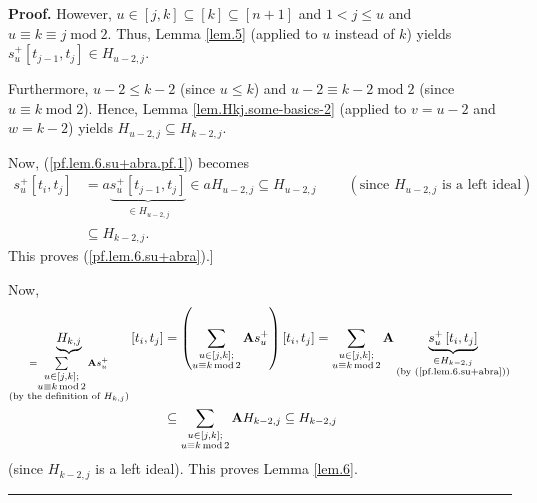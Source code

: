 \documentclass[numbers=enddot,12pt,final,onecolumn,notitlepage]{scrartcl}%
\theoremstyle{definition}
\newenvironment{proof}[1][Proof]{\noindent\textbf{#1.} }{\ \rule{0.5em}{0.5em}}
\let\sumnonlimits\sum
\renewcommand{\sum}{\sumnonlimits\limits}
\begin{document}
\begin{proof}
However, $u\in\left[  j,k\right]  \subseteq\left[  k\right]  \subseteq\left[
n+1\right]  $ and $1<j\leq u$ and $u\equiv k\equiv j\operatorname{mod}2$.
Thus, Lemma \ref{lem.5} (applied to $u$ instead of $k$) yields $s_{u}%
^{+}\left[  t_{j-1},t_{j}\right]  \in H_{u-2,j}$.

Furthermore, $u-2\leq k-2$ (since $u\leq k$) and $u-2\equiv
k-2\operatorname{mod}2$ (since $u\equiv k\operatorname{mod}2$). Hence, Lemma
\ref{lem.Hkj.some-basics-2} (applied to $v=u-2$ and $w=k-2$) yields
$H_{u-2,j}\subseteq H_{k-2,j}$.

Now, (\ref{pf.lem.6.su+abra.pf.1}) becomes%
\begin{align*}
s_{u}^{+}\left[  t_{i},t_{j}\right]   &  =a\underbrace{s_{u}^{+}\left[
t_{j-1},t_{j}\right]  }_{\substack{\in H_{u-2,j}}}\in aH_{u-2,j}\subseteq
H_{u-2,j}\ \ \ \ \ \ \ \ \ \ \left(  \text{since }H_{u-2,j}\text{ is a left
ideal}\right) \\
&  \subseteq H_{k-2,j}.
\end{align*}
This proves (\ref{pf.lem.6.su+abra}).] \medskip

Now,%
\begin{align*}
\underbrace{H_{k,j}}_{\substack{=\sum_{\substack{u\in\left[  j,k\right]
;\\u\equiv k\operatorname{mod}2}}\mathbf{A}s_{u}^{+}\\\text{(by the definition
of }H_{k,j}\text{)}}}\left[  t_{i},t_{j}\right]   &  =\left(  \sum
_{\substack{u\in\left[  j,k\right]  ;\\u\equiv k\operatorname{mod}%
2}}\mathbf{A}s_{u}^{+}\right)  \left[  t_{i},t_{j}\right]  =\sum
_{\substack{u\in\left[  j,k\right]  ;\\u\equiv k\operatorname{mod}%
2}}\mathbf{A}\underbrace{s_{u}^{+}\left[  t_{i},t_{j}\right]  }_{\substack{\in
H_{k-2,j}\\\text{(by (\ref{pf.lem.6.su+abra}))}}}\\
&  \subseteq\sum_{\substack{u\in\left[  j,k\right]  ;\\u\equiv
k\operatorname{mod}2}}\mathbf{A}H_{k-2,j}\subseteq H_{k-2,j}%
\end{align*}
(since $H_{k-2,j}$ is a left ideal). This proves Lemma \ref{lem.6}.
\end{proof}
\end{document}
